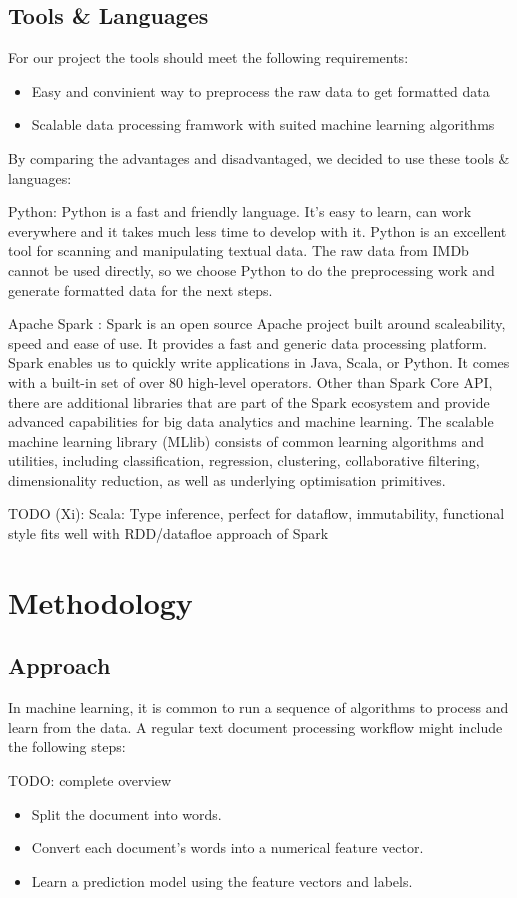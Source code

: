 \documentclass{vldb}
\begin{document}
\subsection{Tools & Languages}
\par For our project the tools should meet the following requirements:
\begin{itemize}
\item {Easy and convinient way to preprocess the raw data to get formatted data}
\item {Scalable data processing framwork with suited machine learning algorithms}
\end{itemize}
\par By comparing the advantages and disadvantaged, we decided to use these tools & languages:
\par Python: Python is a fast and friendly language. It's easy to learn, can work everywhere and it takes much less time to develop with it. Python is an excellent tool for scanning and manipulating textual data. The raw data from IMDb cannot be used directly, so we choose Python to do the preprocessing work and generate formatted data for the next steps. 
\par Apache Spark \cite{spark}: Spark is an open source Apache project built around scaleability, speed and ease of use. It provides a fast and generic data processing platform. Spark enables us to quickly write applications in Java, Scala, or Python. It comes with a built-in set of over 80 high-level operators. Other than Spark Core API, there are additional libraries that are part of the Spark ecosystem and provide advanced capabilities for big data analytics and machine learning. The scalable machine learning library (MLlib) consists of common learning algorithms and utilities, including classification, regression, clustering, collaborative filtering, dimensionality reduction, as well as underlying optimisation primitives.
\par TODO (Xi): Scala: Type inference, perfect for dataflow, immutability, functional style fits well with RDD/datafloe approach of Spark

\section{Methodology}

\subsection{Approach}
In machine learning, it is common to run a sequence of algorithms to process and learn from the data. A regular text document processing workflow might include the following steps:
\par TODO: complete overview
\begin{itemize}
\item {Split the document into words.}
\item {Convert each document's words into a numerical feature vector.}
\item {Learn a prediction model using the feature vectors and labels.}
\end{itemize}
\end{document}
